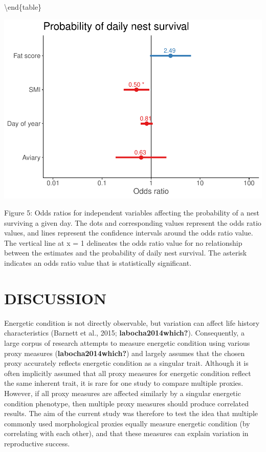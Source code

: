 \documentclass[
]{article}
\begin{document}
\textbackslash end\{table\}

\includegraphics{gcondition_files/figure-latex/logexp-1.pdf}

Figure 5: Odds ratios for independent variables affecting the
probability of a nest surviving a given day. The dots and corresponding
values represent the odds ratio values, and lines represent the
confidence intervals around the odds ratio value. The vertical line at x
= 1 delineates the odds ratio value for no relationship between the
estimates and the probability of daily nest survival. The asterisk
indicates an odds ratio value that is statistically significant.

\hypertarget{discussion}{%
\section{DISCUSSION}\label{discussion}}

Energetic condition is not directly observable, but variation can affect
life history characteristics (Barnett et al., 2015;
\textbf{labocha2014which?}). Consequently, a large corpus of research
attempts to measure energetic condition using various proxy measures
(\textbf{labocha2014which?}) and largely assumes that the chosen proxy
accurately reflects energetic condition as a singular trait. Although it
is often implicitly assumed that all proxy measures for energetic
condition reflect the same inherent trait, it is rare for one study to
compare multiple proxies. However, if all proxy measures are affected
similarly by a singular energetic condition phenotype, then multiple
proxy measures should produce correlated results. The aim of the current
study was therefore to test the idea that multiple commonly used
morphological proxies equally measure energetic condition (by
correlating with each other), and that these measures can explain
variation in reproductive success.
\end{document}
